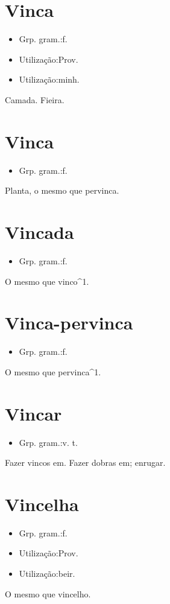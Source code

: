 \documentclass{article}
\begin{document}
\section{Vinca}
\begin{itemize}
\item {Grp. gram.:f.}
\end{itemize}
\begin{itemize}
\item {Utilização:Prov.}
\end{itemize}
\begin{itemize}
\item {Utilização:minh.}
\end{itemize}
Camada.
Fieira.
\section{Vinca}
\begin{itemize}
\item {Grp. gram.:f.}
\end{itemize}
Planta, o mesmo que \textunderscore pervinca\textunderscore .
\section{Vincada}
\begin{itemize}
\item {Grp. gram.:f.}
\end{itemize}
O mesmo que \textunderscore vinco\textunderscore ^1.
\section{Vinca-pervinca}
\begin{itemize}
\item {Grp. gram.:f.}
\end{itemize}
O mesmo que \textunderscore pervinca\textunderscore ^1.
\section{Vincar}
\begin{itemize}
\item {Grp. gram.:v. t.}
\end{itemize}
Fazer vincos em.
Fazer dobras em; enrugar.
\section{Vincelha}
\begin{itemize}
\item {Grp. gram.:f.}
\end{itemize}
\begin{itemize}
\item {Utilização:Prov.}
\end{itemize}
\begin{itemize}
\item {Utilização:beir.}
\end{itemize}
O mesmo que \textunderscore vincelho\textunderscore .
\end{document}
